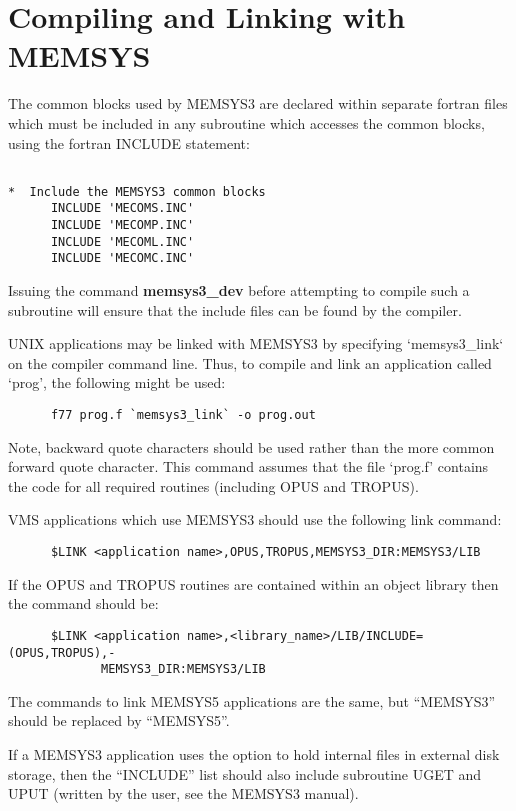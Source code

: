 \section {Compiling and Linking with MEMSYS}
The common blocks used by MEMSYS3 are declared within separate fortran files
which must be included in any subroutine which accesses the common blocks,
using the fortran INCLUDE statement:

\begin{verbatim}

*  Include the MEMSYS3 common blocks
      INCLUDE 'MECOMS.INC'
      INCLUDE 'MECOMP.INC'
      INCLUDE 'MECOML.INC'
      INCLUDE 'MECOMC.INC'
\end{verbatim}

Issuing the command {\bf memsys3\_dev} before attempting to compile such a
subroutine will ensure that the include files can be found by the
compiler.

UNIX applications may be linked with MEMSYS3 by specifying `memsys3\_link`
on the compiler command line. Thus, to compile and link an application
called `prog', the following might be used:

\begin{verbatim}
      f77 prog.f `memsys3_link` -o prog.out
\end{verbatim}

Note, backward quote characters should be used rather than the more common
forward quote character. This command assumes that the file `prog.f' contains
the code for all required routines (including OPUS and TROPUS).

VMS applications which use MEMSYS3 should use the following link command:

\begin{verbatim}
      $LINK <application name>,OPUS,TROPUS,MEMSYS3_DIR:MEMSYS3/LIB
\end{verbatim}

If the OPUS and TROPUS routines are contained within an object library then the
command should be:

\begin{verbatim}
      $LINK <application name>,<library_name>/LIB/INCLUDE=(OPUS,TROPUS),-
             MEMSYS3_DIR:MEMSYS3/LIB
\end{verbatim}

The commands to link MEMSYS5 applications are the same, but ``MEMSYS3'' should
be replaced by ``MEMSYS5''.


If a MEMSYS3 application uses the option to hold internal files in external
disk  storage, then the ``INCLUDE'' list should also include subroutine UGET
and UPUT  (written by the user, see the MEMSYS3 manual).

